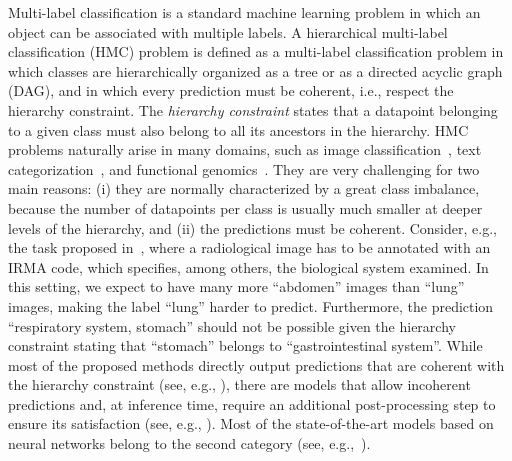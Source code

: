 \documentclass{article}
\begin{document}
Multi-label classification is a standard machine learning problem in which an object can be associated with multiple labels. 
A hierarchical multi-label classification (HMC) problem is defined as a multi-label classification problem in which  classes are hierarchically organized as a tree or as a directed acyclic graph (DAG), and in which every prediction must be coherent, i.e.,
respect the hierarchy constraint.
The {\sl hierarchy constraint} states that a datapoint belonging to a given class must also belong to all its ancestors in the hierarchy.  HMC problems naturally arise in many domains, such as image classification~\cite{imagenet,dimitrovski2008,dimitrovski2011}, text categorization~\citep{klimt2004,lewis04,rouso2006}, and functional genomics~\citep{barutcuoglu2006,clare2003,vens2008}. They are very challenging for two main reasons: (i) they are normally characterized by a great class imbalance, because the number of datapoints per class is usually much smaller at deeper levels of the hierarchy, and (ii) the predictions must be coherent. Consider, e.g., the task proposed in~\cite{dimitrovski2008}, where a radiological image has to be annotated with an IRMA code, which specifies, among others, the biological system examined. In this setting, we expect to have many more ``abdomen'' images  
 than ``lung'' images, making the label ``lung'' harder to predict. Furthermore, the prediction ``respiratory system, stomach'' should not be possible given the hierarchy constraint stating that ``stomach'' belongs to ``gastrointestinal system''.
 While most of the proposed methods
 directly output predictions that are coherent with the hierarchy constraint (see, e.g., \citep{kwok2011,masera2018}), there are models that allow incoherent predictions and, at inference time,  require an additional post-processing step to ensure its satisfaction (see, e.g., \citep{cerri2014,obozinski2008,valentini2011}). Most of the state-of-the-art models based on neural networks belong to the second category (see, e.g.,~\citep{cerri2014,cerri2016,cerri2018}). 
\end{document}
